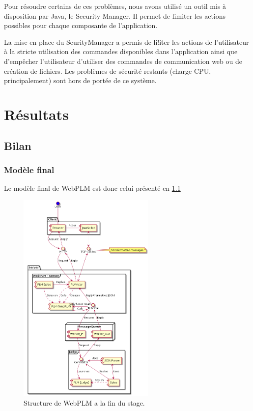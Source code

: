 \documentclass[stage]{tnreport}
\begin{document}
Pour résoudre certains de ces problèmes, nous avons utilisé un outil mis à disposition par Java, le Security Manager. Il permet de limiter les actions possibles pour chaque composante de l'application.

La mise en place du SeurityManager a permis de li!iter les actions de l'utilisateur à la stricte utilisation des commandes disponibles dans l'application ainsi que d'empêcher l'utilisateur d'utiliser des commandes de communication web ou de création de fichiers. Les problèmes de sécurité restants (charge CPU, principalement) sont hors de portée de ce système.

\cleardoublepage 

\chapter{Résultats}

\section{Bilan}

\subsection{Modèle final}

Le modèle final de WebPLM est donc celui présenté en \ref{fig:wplmUP5}
\begin{figure}[h]
	\centering
		\includegraphics[width=0.6\textwidth]{figures/WebPLM-uml-cp3}
	\caption{Structure de WebPLM a la fin du stage.}
	\label{fig:wplmUP5}
\end{figure}
\end{document}

